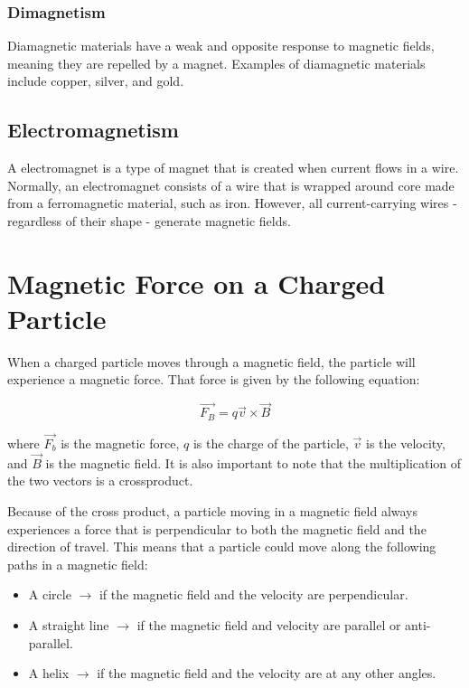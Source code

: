 			\subsubsection{Dimagnetism}  Diamagnetic materials have a weak and opposite response to magnetic fields, meaning they are repelled by a magnet. Examples of diamagnetic materials include copper, silver, and gold.
			
			
		\subsection{Electromagnetism} 
		A \gls{electromagnet} is a type of magnet that is created when current flows in a wire.  Normally, an electromagnet consists of a wire that is wrapped around core made from a ferromagnetic material, such as iron.  However, all current-carrying wires - regardless of their shape - generate magnetic fields. 
		
	\section{Magnetic Force on a Charged Particle}
	
	When a charged particle moves through a magnetic field, the particle will experience a magnetic force.  That force is given by the following equation:
	
	
	\begin{mdframed}[backgroundcolor=orange!20!white]
		\begin{equation}
			\overrightarrow{F_B} = q \vec{v} \times \vec{B}
			\label{eqn:magforceparticle}
		\end{equation}
	\end{mdframed}
	where $\overrightarrow{F_b}$ is the magnetic force, $q$ is the charge of the particle, $\vec{v}$ is the velocity, and $\vec{B}$ is the magnetic field.  It is also important to note that the multiplication of the two vectors is a \gls{crossproduct}.
	
	Because of the cross product, a particle moving in a magnetic field always experiences a force that is perpendicular to both the magnetic field and the direction of travel.  This means that a particle could move along the following paths in a magnetic field:
	\begin{itemize}
		\item A circle $\longrightarrow$ if the magnetic field and the velocity are perpendicular.
		\item A straight line $\longrightarrow$ if the magnetic field and velocity are parallel or anti-parallel. 
		\item A helix $\longrightarrow$ if the magnetic field and the velocity are at any other angles.  
	\end{itemize}
	
